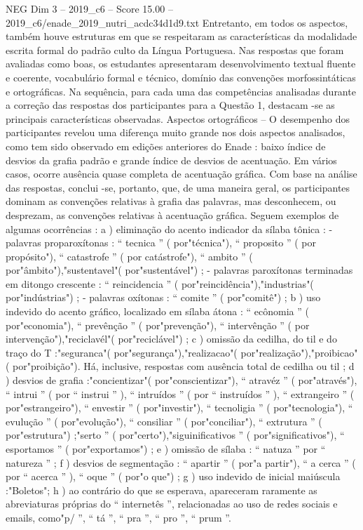 \begin{textsample}{NEG Dim 3 – 2019\_c6 – Score 15.00 – 2019\_c6/enade\_2019\_nutri\_acdc34d1d9.txt}
Entretanto, em todos os aspectos, também houve estruturas em que se respeitaram as características da modalidade escrita formal do padrão culto da Língua Portuguesa.
Nas respostas que foram avaliadas como boas, os estudantes apresentaram desenvolvimento textual fluente e coerente, vocabulário formal e técnico, domínio das convenções morfossintáticas e ortográficas.
Na sequência, para cada uma das competências analisadas durante a correção das respostas dos participantes para a Questão 1, destacam -se as principais características observadas.
Aspectos ortográficos – O desempenho dos participantes revelou uma diferença muito grande nos dois aspectos analisados, como tem sido observado em edições anteriores do Enade : baixo índice de desvios da grafia padrão e grande índice de desvios de acentuação.
Em vários casos, ocorre ausência quase completa de acentuação gráfica.
Com base na análise das respostas, conclui -se, portanto, que, de uma maneira geral, os participantes dominam as convenções relativas à grafia das palavras, mas desconhecem, ou desprezam, as convenções relativas à acentuação gráfica.
Seguem exemplos de algumas ocorrências : a ) eliminação do acento indicador da sílaba tônica : - palavras proparoxítonas : “ tecnica ” ( por"técnica"), “ proposito ” ( por propósito"), “ catastrofe ” ( por catástrofe"), “ ambito ” ( por"âmbito"),"sustentavel"( por"sustentável") ; - palavras paroxítonas terminadas em ditongo crescente : “ reincidencia ” ( por"reincidência"),"industrias"( por"indústrias") ; - palavras oxítonas : “ comite ” ( por"comitê") ; b ) uso indevido do acento gráfico, localizado em sílaba átona : “ ecônomia ” ( por"economia"), “ prevênção ” ( por"prevenção"), “ intervênção ” ( por intervenção"),"reciclavél"( por"reciclável") ; c ) omissão da cedilha, do til e do traço do T :"seguranca"( por"segurança"),"realizacao"( por"realização"),"proibicao"( por"proibição").
Há, inclusive, respostas com ausência total de cedilha ou til ; d ) desvios de grafia :"concientizar"( por"conscientizar"), “ atravéz ” ( por"através"), “ intrui ” ( por “ instrui ” ), “ intruídos ” ( por “ instruídos ” ), “ extrangeiro ” ( por"estrangeiro"), “ envestir ” ( por"investir"), “ tecnoligia ” ( por"tecnologia"), “ evulução ” ( por"evolução"), “ consiliar ” ( por"conciliar"), “ extrutura ” ( por"estrutura") ;"serto ” ( por"certo"),"siguinificativos ” ( por"significativos"), “ esportamos ” ( por"exportamos") ; e ) omissão de sílaba : “ natuza ” por “ natureza ” ; f ) desvios de segmentação : “ apartir ” ( por"a partir"), “ a cerca ” ( por “ acerca ” ), “ oque ” ( por"o que") ; g ) uso indevido de inicial maiúscula :"Boletos"; h ) ao contrário do que se esperava, apareceram raramente as abreviaturas próprias do “ internetês ”, relacionadas ao uso de redes sociais e emails, como"p/ ”, “ tá ”, “ pra ”, “ pro ”, “ prum ”.

\end{textsample}
